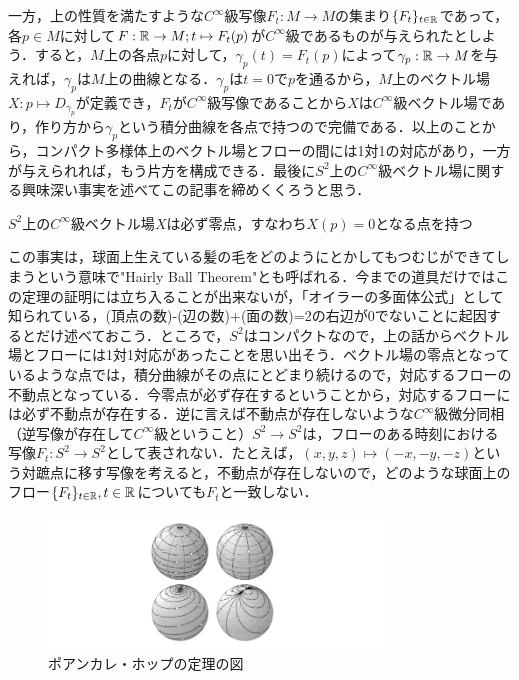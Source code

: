 一方，上の性質を満たすような$C^\infty$級写像$F_t:M\rightarrow M$の集まり$\{F_t\}_{t\in{\mathbb R}}$であって，各$p\in M$に対して$F:{\mathbb R}\rightarrow M;t\mapsto F_t(p)$が$C^\infty$級であるものが与えられたとしよう．すると，$M$上の各点$p$に対して，$\gamma_p(t)=F_t(p)$によって$\gamma_p:{\mathbb R}\rightarrow M$を与えれば，$\gamma_p$は$M$上の曲線となる．$\gamma_p$は$t=0$で$p$を通るから，$M$上のベクトル場$X:p\mapsto D_{\gamma_p}$が定義でき，$F_t$が$C^\infty$級写像であることから$X$は$C^\infty$級ベクトル場であり，作り方から$\gamma_p$という積分曲線を各点で持つので完備である．以上のことから，コンパクト多様体上のベクトル場とフローの間には1対1の対応があり，一方が与えられれば，もう片方を構成できる．最後に$S^2$上の$C^\infty$級ベクトル場に関する興味深い事実を述べてこの記事を締めくくろうと思う．
\begin{s_theo}
$S^2$上の$C^\infty$級ベクトル場$X$は必ず零点，すなわち$X(p)=0$となる点を持つ
\end{s_theo}
この事実は，球面上生えている髪の毛をどのようにとかしてもつむじができてしまうという意味で"Hairly Ball Theorem"とも呼ばれる．今までの道具だけではこの定理の証明には立ち入ることが出来ないが，「オイラーの多面体公式」として知られている，(頂点の数)-(辺の数)+(面の数)=2の右辺が0でないことに起因するとだけ述べておこう．ところで，$S^2$はコンパクトなので，上の話からベクトル場とフローには1対1対応があったことを思い出そう．ベクトル場の零点となっているような点では，積分曲線がその点にとどまり続けるので，対応するフローの不動点となっている．今零点が必ず存在するということから，対応するフローには必ず不動点が存在する．逆に言えば不動点が存在しないような$C^\infty$級微分同相（逆写像が存在して$C^\infty$級ということ）$S^2\rightarrow S^2$は，フローのある時刻における写像$F_t:S^2\rightarrow S^2$として表されない．たとえば，$(x,y,z)\mapsto (-x,-y,-z)$という対蹠点に移す写像を考えると，不動点が存在しないので，どのような球面上のフロー$\{F_t\}_{t\in{\mathbb R}},t\in{\mathbb R}$についても$F_t$と一致しない．
\begin{figure}[h]
  \begin{center} 
    \includegraphics[width=9.0cm]{dev_phthm}
    \caption{ポアンカレ・ホップの定理の図}
  \end{center}
\end{figure}
